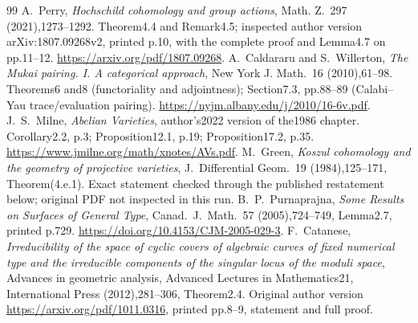 \begin{thebibliography}{99}
 A.~Perry, \emph{Hochschild cohomology and group actions}, Math. Z.~297 (2021),1273--1292. Theorem4.4 and Remark4.5; inspected author version arXiv:1807.09268v2, printed p.10, with the complete proof and Lemma4.7 on pp.11--12. \url{https://arxiv.org/pdf/1807.09268}.
 A.~Caldararu and S.~Willerton, \emph{The Mukai pairing. I. A categorical approach}, New York J. Math.~16 (2010),61--98. Theorems6 and8 (functoriality and adjointness); Section7.3, pp.88--89 (Calabi--Yau trace/evaluation pairing). \url{https://nyjm.albany.edu/j/2010/16-6v.pdf}.
 J.~S.~Milne, \emph{Abelian Varieties}, author's2022 version of the1986 chapter. Corollary2.2, p.3; Proposition12.1, p.19; Proposition17.2, p.35. \url{https://www.jmilne.org/math/xnotes/AVs.pdf}.
 M.~Green, \emph{Koszul cohomology and the geometry of projective varieties}, J.~Differential Geom.~19 (1984),125--171, Theorem(4.e.1). Exact statement checked through the published restatement below; original PDF not inspected in this run.
 B.~P.~Purnaprajna, \emph{Some Results on Surfaces of General Type}, Canad.~J.~Math.~57 (2005),724--749, Lemma2.7, printed p.729. \url{https://doi.org/10.4153/CJM-2005-029-3}.
 F.~Catanese, \emph{Irreducibility of the space of cyclic covers of algebraic curves of fixed numerical type and the irreducible components of the singular locus of the moduli space}, Advances in geometric analysis, Advanced Lectures in Mathematics21, International Press (2012),281--306, Theorem2.4. Original author version \url{https://arxiv.org/pdf/1011.0316}, printed pp.8--9, statement and full proof.
\end{thebibliography}
